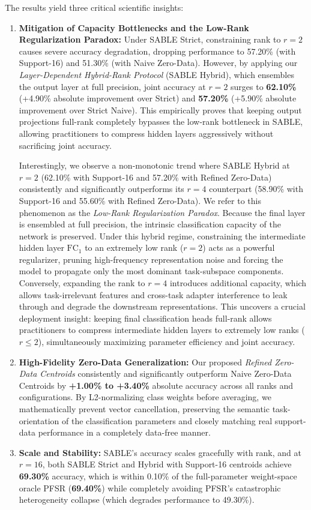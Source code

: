 The results yield three critical scientific insights:
\begin{enumerate}
    \item \textbf{Mitigation of Capacity Bottlenecks and the Low-Rank Regularization Paradox:} Under SABLE Strict, constraining rank to $r=2$ causes severe accuracy degradation, dropping performance to 57.20\% (with Support-16) and 51.30\% (with Naive Zero-Data). However, by applying our \emph{Layer-Dependent Hybrid-Rank Protocol} (SABLE Hybrid), which ensembles the output layer at full precision, joint accuracy at $r=2$ surges to \textbf{62.10\%} (+4.90\% absolute improvement over Strict) and \textbf{57.20\%} (+5.90\% absolute improvement over Strict Naive). This empirically proves that keeping output projections full-rank completely bypasses the low-rank bottleneck in SABLE, allowing practitioners to compress hidden layers aggressively without sacrificing joint accuracy.

    Interestingly, we observe a non-monotonic trend where SABLE Hybrid at $r=2$ (62.10\% with Support-16 and 57.20\% with Refined Zero-Data) consistently and significantly outperforms its $r=4$ counterpart (58.90\% with Support-16 and 55.60\% with Refined Zero-Data). We refer to this phenomenon as the \emph{Low-Rank Regularization Paradox}. Because the final layer is ensembled at full precision, the intrinsic classification capacity of the network is preserved. Under this hybrid regime, constraining the intermediate hidden layer $\text{FC}_1$ to an extremely low rank ($r=2$) acts as a powerful regularizer, pruning high-frequency representation noise and forcing the model to propagate only the most dominant task-subspace components. Conversely, expanding the rank to $r=4$ introduces additional capacity, which allows task-irrelevant features and cross-task adapter interference to leak through and degrade the downstream representations. This uncovers a crucial deployment insight: keeping final classification heads full-rank allows practitioners to compress intermediate hidden layers to extremely low ranks ($r \le 2$), simultaneously maximizing parameter efficiency and joint accuracy.
    \item \textbf{High-Fidelity Zero-Data Generalization:} Our proposed \emph{Refined Zero-Data Centroids} consistently and significantly outperform Naive Zero-Data Centroids by \textbf{+1.00\% to +3.40\%} absolute accuracy across all ranks and configurations. By L2-normalizing class weights before averaging, we mathematically prevent vector cancellation, preserving the semantic task-orientation of the classification parameters and closely matching real support-data performance in a completely data-free manner.
    \item \textbf{Scale and Stability:} SABLE's accuracy scales gracefully with rank, and at $r=16$, both SABLE Strict and Hybrid with Support-16 centroids achieve \textbf{69.30\%} accuracy, which is within 0.10\% of the full-parameter weight-space oracle PFSR (\textbf{69.40\%}) while completely avoiding PFSR's catastrophic heterogeneity collapse (which degrades performance to 49.30\%).
\end{enumerate}

